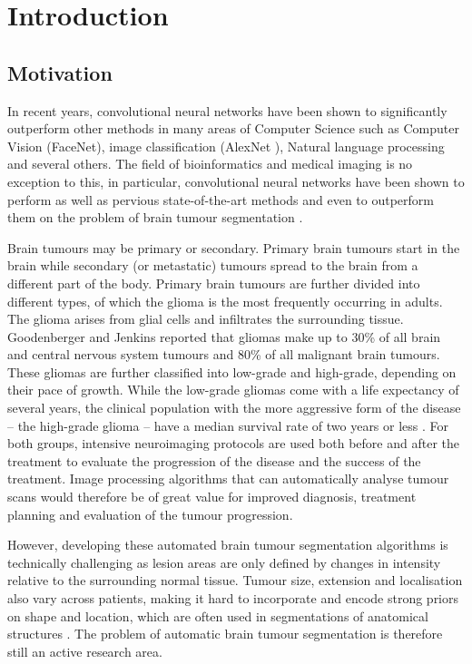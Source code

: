 \documentclass[12pt,a4paper,twoside,openright]{report}
\begin{document}


\pagestyle{headings}

\chapter{Introduction}
\section{Motivation}
In recent years, convolutional neural networks have been shown to significantly outperform other methods in many areas of Computer Science such as Computer Vision (FaceNet\cite{face_net}), image classification (AlexNet \cite{alex_net}), Natural language processing \cite{nlp_deep_learning} and several others. The field of bioinformatics and medical imaging is no exception to this, in particular, convolutional neural networks have been shown to perform as well as pervious \mbox{state-of-the-art} methods and even to outperform them on the problem of brain tumour segmentation \cite{pereira, kamnitas}.

Brain tumours may be primary or secondary. Primary brain tumours start in the brain while secondary (or metastatic) tumours spread to the brain from a different part of the body. Primary brain tumours are further divided into different types, of which the glioma is the most frequently occurring in adults. The  glioma arises from glial cells and infiltrates the surrounding tissue. Goodenberger and Jenkins \cite{gliomas_research} reported that gliomas make up to 30\% of all brain and central nervous system tumours and 80\% of all malignant brain tumours. These gliomas are further classified into low-grade and high-grade, depending on their pace of growth. While the low-grade gliomas come with a life expectancy of several years, the clinical population with the more aggressive form of the disease -- the high-grade glioma -- have a median survival rate of two years or less \cite{gliomas_life}. For both groups, intensive neuroimaging protocols are used both before and after the treatment to evaluate the progression of the disease and the success of the treatment. Image processing algorithms that can automatically analyse tumour scans would therefore be of great value for improved diagnosis, treatment planning and evaluation of the tumour progression. 

However, developing these automated brain tumour segmentation algorithms is technically challenging as lesion areas are only defined by changes in intensity relative to the surrounding normal tissue. Tumour size, extension and localisation also vary across patients, making it hard to incorporate and encode strong priors on shape and location, which are often used in segmentations of anatomical structures \cite{brats-proceedings}. The problem of automatic brain tumour segmentation is therefore still an active research area. 
\end{document}
